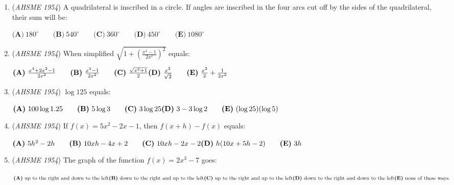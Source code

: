\begin{enumerate}
 
 \begin{align*}2x-3y &=7 \\ 4x-6y &=20\end{align*}



 is: 


 $\textbf{(A)}\ x=18, y=12 \qquad  \textbf{(B)}\ x=0, y=0 \qquad  \textbf{(C)}\ \text{There is no solution} \\  \textbf{(D)}\ \text{There are an unlimited number of solutions}\qquad \textbf{(E)}\ x=8, y=5$


	\item (\textit{AHSME 1954}) A quadrilateral is inscribed in a circle. If angles are inscribed in the four arcs cut off 
by the sides of the quadrilateral, their sum will be: 


 $\textbf{(A)}\ 180^\circ \qquad \textbf{(B)}\ 540^\circ \qquad \textbf{(C)}\ 360^\circ \qquad \textbf{(D)}\ 450^\circ\qquad\textbf{(E)}\ 1080^\circ$


	\item (\textit{AHSME 1954}) When simplified $\sqrt{1+ \left (\frac{x^4-1}{2x^2} \right )^2}$ equals: 


 $\textbf{(A)}\ \frac{x^4+2x^2-1}{2x^2} \qquad \textbf{(B)}\ \frac{x^4-1}{2x^2} \qquad \textbf{(C)}\ \frac{\sqrt{x^2+1}}{2}\\ \textbf{(D)}\ \frac{x^2}{\sqrt{2}}\qquad\textbf{(E)}\ \frac{x^2}{2}+\frac{1}{2x^2}$


	\item (\textit{AHSME 1954}) $\log 125$ equals: 


 $\textbf{(A)}\ 100 \log 1.25 \qquad \textbf{(B)}\ 5 \log 3 \qquad \textbf{(C)}\ 3 \log 25  \\ \textbf{(D)}\ 3 - 3\log 2 \qquad \textbf{(E)}\ (\log 25)(\log 5)$


	\item (\textit{AHSME 1954}) If $f(x) = 5x^2 - 2x - 1$, then $f(x + h) - f(x)$ equals: 


 $\textbf{(A)}\ 5h^2 - 2h \qquad \textbf{(B)}\ 10xh - 4x + 2 \qquad \textbf{(C)}\ 10xh - 2x - 2 \\ \textbf{(D)}\ h(10x+5h-2)\qquad\textbf{(E)}\ 3h$


	\item (\textit{AHSME 1954}) The graph of the function $f(x) = 2x^3 - 7$ goes: 


 $\textbf{(A)}\ \text{up to the right and down to the left} \\ \textbf{(B)}\ \text{down to the right and up to the left}\\ \textbf{(C)}\ \text{up to the right and up to the left}\\ \textbf{(D)}\ \text{down to the right and down to the left}\\ \textbf{(E)}\ \text{none of these ways.}$



\end{enumerate}
